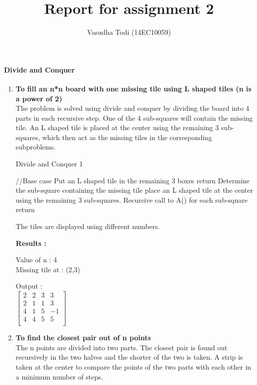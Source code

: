 \documentclass[a4paper,11pt]{article}
\title{Report for assignment 2}
\author{Vasudha Todi (14EC10059)}
\begin{document}
\maketitle

\paragraph{Divide and Conquer}
\begin{enumerate}
 \item \textbf{To fill an n*n board with one missing tile using L shaped tiles (n is a power of 2)}\\
The problem is solved using divide and conquer by dividing the board into 4 parts in each recursive step. One of the 4 sub-squares will contain the missing tile. An L shaped tile is placed at the center using the remaining 3 sub-squares, which then act as the missing tiles in the corresponding subproblems.

  \begin{algorithm}
    \caption{Divide and Conquer 1}
    \begin{algorithmic}[1]
                             //Base case
        \State Put an L shaped tile in the remaining 3 boxes 
        \State return
    \EndIf
    \State Determine the sub-square containing the missing tile
    \State place an L shaped tile at the center using the remaining 3 sub-squares.
    \State Recursive call to A() for each sub-square
    \State return
    \end{algorithmic}
  \end{algorithm}
  
 The tiles are displayed using different numbers.
 
 \textbf{Results :}
 
 Value of n : 4\\
 Missing tile at : (2,3)
 
 Output :\\
 \(
 \left[
 \begin{array}{cccc}
 2 & 2 & 3 & 3\\
 2 & 1 & 1 & 3\\
 4 & 1 & 5 & -1\\
 4 & 4 & 5 & 5\\
 \end{array}
 \right]
 \)
 \item \textbf{To find the closest pair out of n points}\\
The n points are divided into two parts. The closest pair is found out recursively in the two halves and the shorter of the two is taken. A strip is taken at the center to compare the points of the two parts with each other in a minimum number of steps.


\end{enumerate}
\end{document}
